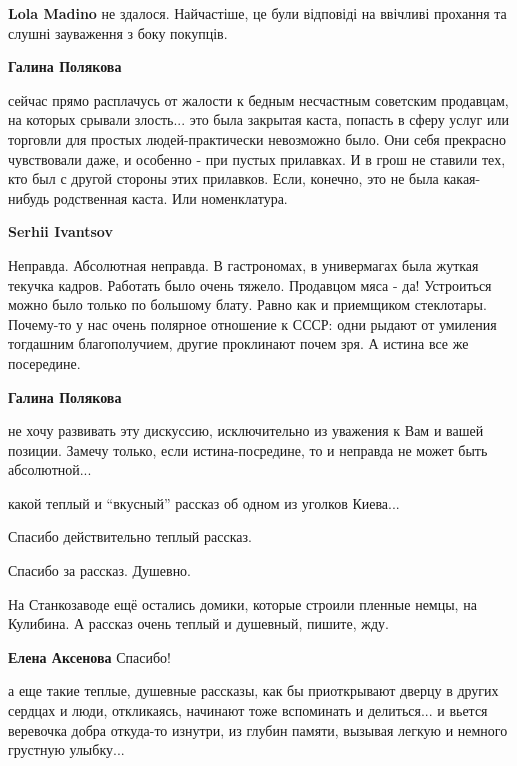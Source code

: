 \begin{itemize}
\begin{itemize}
\begin{itemize}
\textbf{Lola Madino} не здалося. Найчастіше, це були відповіді на ввічливі прохання та слушні зауваження з боку покупців.

\textbf{Галина Полякова} 

сейчас прямо расплачусь от жалости к бедным несчастным советским продавцам, на
которых срывали злость... это была закрытая каста, попасть в сферу услуг или
торговли для простых людей-практически невозможно было. Они себя прекрасно
чувствовали даже, и особенно - при пустых прилавках. И в грош не ставили тех,
кто был с другой стороны этих прилавков. Если, конечно, это не была
какая-нибудь родственная каста. Или номенклатура.

\textbf{Serhii Ivantsov} 

Неправда. Абсолютная неправда. В гастрономах, в универмагах была жуткая текучка
кадров. Работать было очень тяжело. Продавцом мяса - да! Устроиться можно было
только по большому блату. Равно как и приемщиком стеклотары. Почему-то у нас
очень полярное отношение к СССР: одни рыдают от умиления тогдашним
благополучием, другие проклинают почем зря. А истина все же посередине.


\textbf{Галина Полякова} 

не хочу развивать эту дискуссию, исключительно из уважения к Вам и вашей
позиции. Замечу только, если истина-посредине, то и неправда не может быть
абсолютной...

\end{itemize} %

\end{itemize} %

какой теплый и \enquote{вкусный} рассказ об одном из уголков Киева...

Спасибо действительно теплый рассказ.

Спасибо за рассказ. Душевно.


На Станкозаводе ещё остались домики, которые строили пленные немцы, на
Кулибина. А рассказ очень теплый и душевный, пишите, жду.

\textbf{Елена Аксенова} Спасибо!


а еще такие теплые, душевные рассказы, как бы приоткрывают дверцу в других
сердцах и люди, откликаясь, начинают тоже вспоминать и делиться... и вьется
веревочка добра откуда-то изнутри, из глубин памяти, вызывая легкую и немного
грустную улыбку...


\end{itemize}
